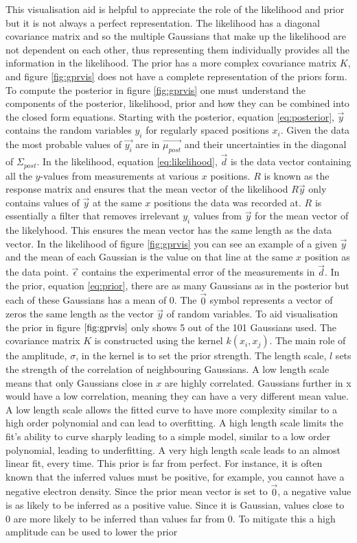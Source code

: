 \noindent This visualisation aid is helpful to appreciate the role of the likelihood and prior but it is not always a perfect representation. The likelihood has a diagonal covariance matrix and so the multiple Gaussians that make up the likelihood are not dependent on each other, thus representing them individually provides all the information in the likelihood. The prior has a more complex covariance matrix $K$, and figure \ref{fig:gprvis} does not have a complete representation of the priors form. To compute the posterior in figure \ref{fig:gprvis} one must understand the components of the posterior, likelihood, prior and how they can be combined into the closed form equations. Starting with the posterior, equation \ref{eq:posterior}, $\vec{y}$ contains the random variables $y_i$ for regularly spaced positions $x_i$. Given the data the most probable values of $\vec{y_i}$ are in $\vec{\mu_{post}}$ and their uncertainties in the diagonal of $\Sigma_{post}$. In the likelihood, equation \ref{eq:likelihood}, $\vec{d}$ is the data vector containing all the $y$-values from measurements at various $x$ positions. $R$ is known as the response matrix and ensures that the mean vector of the likelihood $R\vec{y}$ only contains values of $\vec{y}$ at the same $x$ positions the data was recorded at. $R$ is essentially a filter that removes irrelevant $y_i$ values from $\vec{y}$ for the mean vector of the likelyhood. This ensures the mean vector has the same length as the data vector. In the likelihood of figure \ref{fig:gprvis} you can see an example of a given $\vec{y}$ and the mean of each Gaussian is the value on that line at the same $x$ position as the data point. $\vec{\epsilon}$ contains the experimental error of the measurements in $\vec{d}$. In the prior, equation \ref{eq:prior}, there are as many Gaussians as in the posterior but each of these Gaussians has a mean of 0. The $\vec{0}$ symbol represents a vector of zeros the same length as the vector $\vec{y}$ of random variables. To aid visualisation the prior in figure $\ref{fig:gprvis}$ only shows 5 out of the 101 Gaussians used. The covariance matrix $K$ is constructed using the kernel $k(x_i,x_j)$. The main role of the amplitude, $\sigma$, in the kernel is to set the prior strength. The length scale, $l$ sets the strength of the correlation of neighbouring Gaussians. A low length scale means that only Gaussians close in $x$ are highly correlated. Gaussians further in x would have a low correlation, meaning they can have a very different mean value. A low length scale allows the fitted curve to have more complexity similar to a high order polynomial and can lead to overfitting. A high length scale limits the fit's ability to curve sharply leading to a simple model, similar to a low order polynomial, leading to underfitting. A very high length scale leads to an almost linear fit, every time. This prior is far from perfect. For instance, it is often known that the inferred values must be positive, for example, you cannot have a negative electron density. Since the prior mean vector is set to $\vec{0}$, a negative value is as likely to be inferred as a positive value. Since it is Gaussian, values close to 0 are more likely to be inferred than values far from 0. To mitigate this a high amplitude can be used to lower the prior 